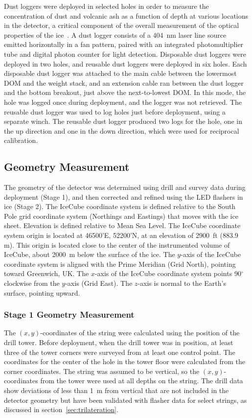 Dust loggers were deployed in selected holes in order to measure the
concentration of dust and volcanic ash as a function of depth at various
locations in the detector, a critical component of the overall measurement
of the optical properties of the
ice~\cite{Aartsen:2013rt,citeulike:2998650}. A dust logger consists of a 404~nm laser line source emitted horizontally in a
fan pattern, paired with an integrated
photomultiplier tube and digital photon counter for light
detection. Disposable dust loggers were deployed in two holes, and reusable dust loggers were
deployed in six holes. Each disposable dust
logger was attached to the main cable between the lowermost DOM and the
weight stack, and an extension cable ran between the dust logger and the
bottom breakout, just above the next-to-lowest DOM. In this mode, the hole
was logged once during deployment, and the logger was not
retrieved. The reusable dust logger was used to
log holes just before deployment, using a separate winch. The reusable
dust logger produced two logs for the 
hole, one in the up direction and one in the down direction, which were used for
reciprocal calibration.


\subsection{Geometry Measurement}

The geometry of the detector was determined using drill and survey data
during deployment (Stage 1), and then corrected and refined using the LED
flashers in ice (Stage 2). The IceCube coordinate system is
defined relative to the South Pole grid coordinate system (Northings and
Eastings) that moves with the ice sheet.  Elevation is defined relative to
Mean Sea Level.  The IceCube coordinate system origin
is located at 46500'E, 52200'N, at an elevation of 2900~ft (883.9
m).  This origin is located close to the center of the instrumented volume of
IceCube, about 2000~m below the surface of the ice. The $y$-axis of
the IceCube coordinate system is aligned with the Prime Meridian (Grid North),
pointing toward Greenwich, UK. The $x$-axis of the IceCube coordinate
system points 90$^{\circ}$ clockwise from the $y$-axis (Grid East). The $z$-axis is
normal to the Earth's surface, pointing upward. 

\subsubsection{\label{subsec:stage1_geo}Stage 1 Geometry Measurement}
The $(x,y)$-coordinates of the string were calculated using the position of
the drill tower. Before deployment, when the drill tower was in position, at
least three of the tower corners were surveyed from at least one control
point.  The coordinates for the center of the hole in the tower floor were
calculated from the corner coordinates. The string was assumed to be
vertical, so the $(x,y)$-coordinates from the tower were used at all
depths on the string. The drill
data show deviations of less than 1~m from vertical that are not
included in the detector geometry but have been validated
with flasher data for select strings, as discussed in section~\ref{sec:trilateration}. 

